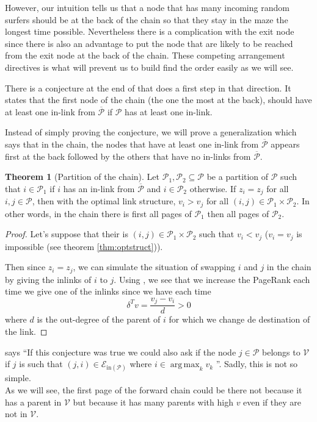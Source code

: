 \documentclass{article}
\DeclareMathOperator*{\argmax}{arg\,max}
\newcommand{\1}{\mathbf{1}}
\theoremstyle{definition}
\newtheorem{mytheo}[mydef]{Theorem}
\begin{document}
However, our intuition tells us that a node that has many incoming random surfers should be at the back
of the chain so that they stay in the maze the longest time possible.
Nevertheless there is a complication with the exit node since there is also an advantage to put the node that are
likely to be reached from the exit node at the back of the chain.
These competing arrangement directives is what will prevent us to build find the order easily as we will see.

There is a conjecture at the end of \cite{de2008maximizing} that does a first step in that direction.
It states that the first node of the chain (the one the most at the back), should have at least one in-link from $\overline{\mathcal{P}}$
if $\mathcal{P}$ has at least one in-link.

Instead of simply proving the conjecture, we will prove a generalization
which says that in the chain, the nodes that have at least one in-link from $\overline{\mathcal{P}}$ appears first at the back
followed by the others that have no in-links from $\overline{\mathcal{P}}$.
\begin{mytheo}[Partition of the chain]
  \label{theo:partition}
  Let \(\mathcal{P}_1,\mathcal{P}_2 \subseteq \mathcal{P}\) be a partition of \(\mathcal{P}\) such that
  \(i \in \mathcal{P}_1\) if \(i\) has an in-link from \(\overline{\mathcal{P}}\) and \(i \in \mathcal{P}_2\)
  otherwise.
  If \(z_i = z_j\) for all \(i,j \in \mathcal{P}\),
  then with the optimal link structure,
  \(v_i > v_j\) for all \((i,j) \in \mathcal{P}_1 \times \mathcal{P}_2\).
  In other words, in the chain there is first all pages of
  \(\mathcal{P}_1\) then all pages of \(\mathcal{P}_2\).
  \begin{proof}
    Let's suppose that their is \((i,j) \in \mathcal{P}_1 \times \mathcal{P}_2\)
    such that \(v_i < v_j\) (\(v_i = v_j\) is impossible (see theorem \ref{thm:optstruct})).

    Then since \(z_i = z_j\), we can simulate the situation of swapping \(i\) and \(j\) in the chain
    by giving the inlinks of \(i\) to \(j\).
    Using \cite[theorem~5]{de2008maximizing}, we see that we increase the PageRank each time we give one of the inlinks since
    we have each time
    \[ \delta^Tv = \frac{v_j - v_i}{d} > 0 \]
    where \(d\) is the out-degree of the parent of \(i\) for which we change de destination of the link.
  \end{proof}
\end{mytheo}

\cite{de2008maximizing} says
``If this conjecture was true we could also ask if the node \(j \in \mathcal{P}\) belongs to \(\mathcal{V}\) if \(j\) is such that
\((j, i) \in \mathcal{E}_{\text{in}(\mathcal{P})}\) where \(i \in \argmax_k v_k\) ''.
Sadly, this is not so simple. \\
As we will see, the first page of the forward chain could be there not
because it has a parent in \(\mathcal{V}\) but because it has many parents with high \(v\) even if they are not in \(\mathcal{V}\).
\end{document}
